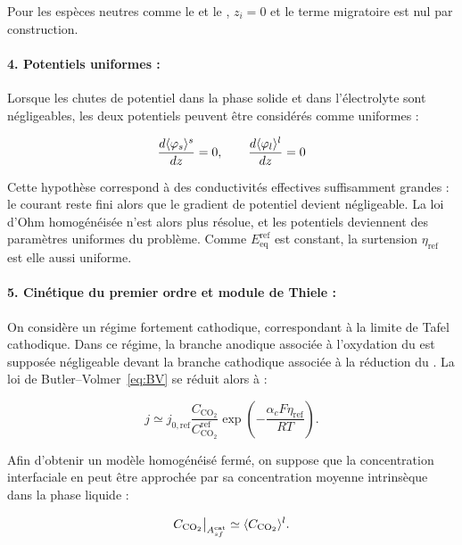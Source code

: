 Pour les espèces neutres comme le  et le , $z_i = 0$ et le terme
migratoire est nul par construction.

\paragraph{4. Potentiels uniformes :}
Lorsque les chutes de potentiel dans la phase solide et dans l'électrolyte
sont négligeables, les deux potentiels peuvent être considérés comme uniformes :

\begin{equation}
\frac{d\langle \varphi_s \rangle^s}{dz} = 0,
\qquad
\frac{d\langle \varphi_l \rangle^l}{dz} = 0
\end{equation}

Cette hypothèse correspond à des conductivités effectives suffisamment grandes :
le courant reste fini alors que le gradient de potentiel devient négligeable.
La loi d'Ohm homogénéisée n'est alors plus résolue, et les potentiels deviennent
des paramètres uniformes du problème. Comme $E_{\mathrm{eq}}^{\mathrm{ref}}$ est
constant, la surtension $\eta_{\mathrm{ref}}$ est elle aussi uniforme.

\paragraph{5. Cinétique du premier ordre et module de Thiele :}

On considère un régime fortement cathodique, correspondant à la limite
de Tafel cathodique. Dans ce régime, la branche anodique associée à
l'oxydation du  est supposée négligeable devant la branche
cathodique associée à la réduction du . La loi de
Butler--Volmer~\eqref{eq:BV} se réduit alors à :

\begin{equation}
j
\simeq
j_{0,\mathrm{ref}}
\frac{C_{\mathrm{CO_2}}}
     {C_{\mathrm{CO_2}}^{\mathrm{ref}}}
\exp\!\left(
-\frac{\alpha_c F\eta_{\mathrm{ref}}}{RT}
\right).
\end{equation}

Afin d'obtenir un modèle homogénéisé fermé, on suppose que la
concentration interfaciale en  peut être approchée par sa
concentration moyenne intrinsèque dans la phase liquide :

\begin{equation}
C_{\mathrm{CO_2}}
\big|_{A_{sf}^{\mathrm{cat}}}
\simeq
\langle C_{\mathrm{CO_2}} \rangle^l.
\end{equation}

